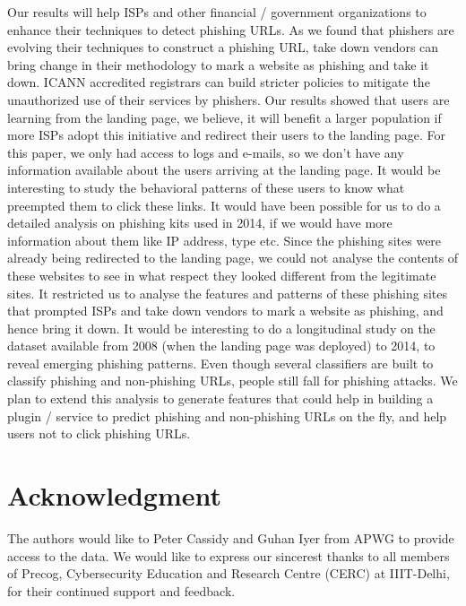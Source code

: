 \documentclass[conference]{IEEEtran}
\begin{document}
\newline\indent
Our results will help ISPs and other financial / government organizations to enhance their techniques to detect phishing URLs. As we found that phishers are evolving their techniques to construct a phishing URL, take down vendors can bring change in their methodology to mark a website as phishing and take it down. ICANN accredited registrars can build stricter policies to mitigate the unauthorized use of their services by phishers. Our results showed that users are learning from the landing page, we believe, it will benefit a larger population if more ISPs adopt this initiative and redirect their users to the landing page.
\newline\indent
For this paper, we only had access to logs and e-mails, so we don't have any information available about the users arriving at the landing page. It would be interesting to study the behavioral patterns of these users to know what preempted them to click these links. It would have been possible for us to do a detailed analysis on phishing kits used in 2014, if we would have more information about them like IP address, type etc. Since the phishing sites were already being redirected to the landing page, we could not analyse the contents of these websites to see in what respect they looked different from the legitimate sites. It restricted us to analyse the features and patterns of these phishing sites that prompted ISPs and take down vendors to mark a website as phishing, and hence bring it down. It would be interesting to do a longitudinal study on the dataset available from 2008 (when the landing page was deployed) to 2014, to reveal emerging phishing patterns. Even though several classifiers are built to classify phishing and non-phishing URLs, people still fall for phishing attacks. We plan to extend this analysis to generate features that could help in building a plugin / service to predict phishing and non-phishing URLs on the fly, and help users not to click phishing URLs.

\section*{Acknowledgment}

The authors would like to Peter Cassidy and Guhan Iyer from APWG to provide access to the data. We would like to express our sincerest thanks to all members of Precog, Cybersecurity Education and Research Centre (CERC) at IIIT-Delhi, for their continued support and feedback.








\end{document}
